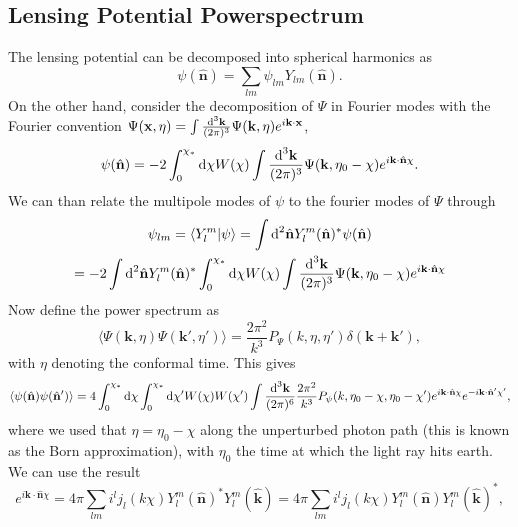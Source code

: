 \documentclass[11pt]{article} %
\DeclareRobustCommand{\d}{\ifmmode\text{d}\else d\fi}
\begin{document}
\subsection{Lensing Potential Powerspectrum}
The lensing potential can be decomposed into spherical harmonics as
\begin{equation}
    \psi(\hat{\mathbf n}) = \sum_{lm} \psi_{lm}Y_{lm}(\hat{\mathbf n}).
\end{equation}
On the other hand, consider the decomposition of $\Psi$ in Fourier modes with the Fourier convention $\Psi(\mathbf x, \eta)=\int\frac{\d^3 \mathbf k}{(2\pi)^{3}}\Psi(\mathbf k, \eta)e^{i\mathbf k \cdot\mathbf x}$,
\begin{equation}
    \psi(\hat{\mathbf n}) = -2 \int_0^{\chi_*}\d \chi W(\chi) \int\frac{\d^3 \mathbf k}{(2\pi)^{3}}\Psi(\mathbf k, \eta_0 - \chi)e^{i\mathbf k \cdot\hat{\mathbf n}\chi}.
\end{equation}
We can than relate the multipole modes of $\psi$ to the fourier modes of $\Psi$ through %
\begin{gather}
    \psi_{lm} = \langle Y_l^m | \psi \rangle = \int\d^2\hat{\mathbf n} Y_l^m(\hat{\mathbf n})^* \psi(\hat{\mathbf n})\\ 
    = -2\int\d^2\hat{\mathbf n} Y_l^m(\hat{\mathbf n})^* \int_0^{\chi_*}\d \chi W(\chi) \int\frac{\d^3 \mathbf k}{(2\pi)^{3}}\Psi(\mathbf k, \eta_0 - \chi)e^{i\mathbf k \cdot\hat{\mathbf n}\chi}
\end{gather}
Now define the power spectrum as
\begin{equation}
    \langle \Psi(\mathbf k, \eta)\Psi(\mathbf k',\eta')\rangle = \frac{2\pi^2}{k^3}P_\Psi(k, \eta, \eta')\delta(\mathbf k + \mathbf k'),
\end{equation}
with $\eta$ denoting the conformal time. This gives 
\begin{equation}
    \langle \psi(\hat{\mathbf n})\psi(\hat{\mathbf n}') \rangle = 4\int_0^{\chi_*}\d \chi\int_0^{\chi_*}\d \chi' W(\chi)W(\chi')\int \frac{\d^3\mathbf k}{(2\pi)^6}\frac{2\pi^2}{k^3}P_\psi(k,\eta_0 - \chi, \eta_0-\chi')e^{i\mathbf k\cdot\hat {\mathbf n}\chi}e^{-i\mathbf k\cdot\hat {\mathbf n}'\chi'},
\end{equation}
where we used that $\eta = \eta_0 - \chi$ along the unperturbed photon path (this is known as the Born approximation), with $\eta_0$ the time at which the light ray hits earth. 
We can use the result
\begin{equation}
    e^{i\mathbf k \cdot \hat {\mathbf n}\chi}=4\pi\sum_{lm}i^lj_l(k\chi )Y_l^m(\hat{\mathbf n})^*Y_l^m(\hat{\mathbf k}) = 4\pi\sum_{lm}i^lj_l(k\chi )Y_l^m(\hat{\mathbf n})Y_l^m(\hat{\mathbf k})^*, \label{eq:complexexp}
\end{equation}
\end{document}
